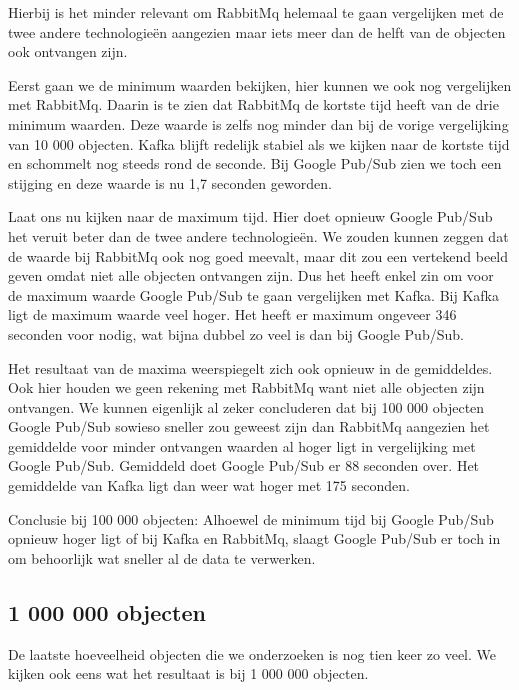 Hierbij is het minder relevant om RabbitMq helemaal te gaan vergelijken met de twee andere technologieën aangezien maar iets meer dan de helft van de objecten ook ontvangen zijn.

Eerst gaan we de minimum waarden bekijken, hier kunnen we ook nog vergelijken met RabbitMq. Daarin is te zien dat RabbitMq de kortste tijd heeft van de drie minimum waarden. Deze waarde is zelfs nog minder dan bij de vorige vergelijking van 10 000 objecten. Kafka blijft redelijk stabiel als we kijken naar de kortste tijd en schommelt nog steeds rond de seconde. Bij Google Pub/Sub zien we toch een stijging en deze waarde is nu 1,7 seconden geworden.

Laat ons nu kijken naar de maximum tijd. Hier doet opnieuw Google Pub/Sub het veruit beter dan de twee andere technologieën. We zouden kunnen zeggen dat de waarde bij RabbitMq ook nog goed meevalt, maar dit zou een vertekend beeld geven omdat niet alle objecten ontvangen zijn. Dus het heeft enkel zin om voor de maximum waarde Google Pub/Sub te gaan vergelijken met Kafka. Bij Kafka ligt de maximum waarde veel hoger. Het heeft er maximum ongeveer 346 seconden voor nodig, wat bijna dubbel zo veel is dan bij Google Pub/Sub.

Het resultaat van de maxima weerspiegelt zich ook opnieuw in de gemiddeldes. Ook hier houden we geen rekening met RabbitMq want niet alle objecten zijn ontvangen. We kunnen eigenlijk al zeker concluderen dat bij 100 000 objecten Google Pub/Sub sowieso sneller zou geweest zijn dan RabbitMq aangezien het gemiddelde voor minder ontvangen waarden al hoger ligt in vergelijking met Google Pub/Sub. Gemiddeld doet Google Pub/Sub er 88 seconden over. Het gemiddelde van Kafka ligt dan weer wat hoger met 175 seconden.

Conclusie bij 100 000 objecten: Alhoewel de minimum tijd bij Google Pub/Sub opnieuw hoger ligt of bij Kafka en RabbitMq, slaagt Google Pub/Sub er toch in om behoorlijk wat sneller al de data te verwerken. 

\subsection{1 000 000 objecten}
De laatste hoeveelheid objecten die we onderzoeken is nog tien keer zo veel. We kijken ook eens wat het resultaat is bij 1 000 000 objecten.
